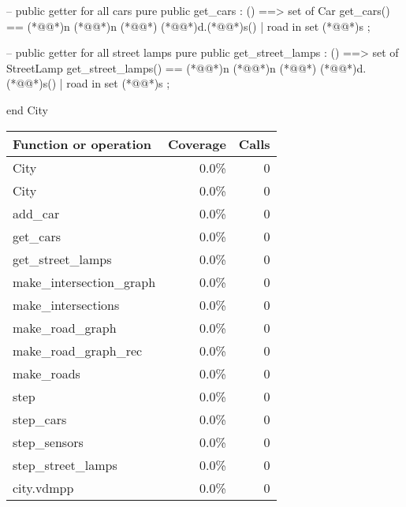 \documentclass[a4paper]{article}
\begin{document}
\begin{vdm_al}
    -- public getter for all cars
    pure public get_cars : () ==> set of Car
    get_cars() ==
        (*@@*)n (*@@*)n (*@\vdmnotcovered{}@*){
            (*@@*)d.(*@@*)s()
            | road in set (*@@*)s
        };
    
    -- public getter for all street lamps
    pure public get_street_lamps : () ==> set of StreetLamp
    get_street_lamps() ==
        (*@@*)n (*@@*)n (*@\vdmnotcovered{}@*){
            (*@@*)d.(*@@*)s()
            | road in set (*@@*)s
        };

end City
\end{vdm_al}
\bigskip
\begin{longtable}{|l|r|r|}
\hline
Function or operation & Coverage & Calls \\
\hline
\hline
City & 0.0\% & 0 \\
\hline
City & 0.0\% & 0 \\
\hline
add\_car & 0.0\% & 0 \\
\hline
get\_cars & 0.0\% & 0 \\
\hline
get\_street\_lamps & 0.0\% & 0 \\
\hline
make\_intersection\_graph & 0.0\% & 0 \\
\hline
make\_intersections & 0.0\% & 0 \\
\hline
make\_road\_graph & 0.0\% & 0 \\
\hline
make\_road\_graph\_rec & 0.0\% & 0 \\
\hline
make\_roads & 0.0\% & 0 \\
\hline
step & 0.0\% & 0 \\
\hline
step\_cars & 0.0\% & 0 \\
\hline
step\_sensors & 0.0\% & 0 \\
\hline
step\_street\_lamps & 0.0\% & 0 \\
\hline
\hline
city.vdmpp & 0.0\% & 0 \\
\hline
\end{longtable}
\end{document}
